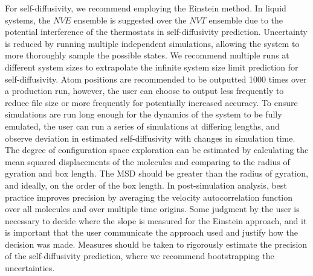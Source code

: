 \documentclass[9pt,bestpractices]{livecoms}
\begin{document}
For self-diffusivity, we recommend employing the Einstein method. In liquid systems, the $NVE$ ensemble is suggested over the $NVT$ ensemble due to the potential interference of the thermostats in self-diffusivity prediction. Uncertainty is reduced by running multiple independent simulations, allowing the system to more thoroughly sample the possible states. We recommend multiple runs at different system sizes to extrapolate the infinite system size limit prediction for self-diffusivity. Atom positions are recommended to be outputted 1000 times over a production run, however, the user can choose to output less frequently to reduce file size or more frequently for potentially increased accuracy. To ensure simulations are run long enough for the dynamics of the system to be fully emulated, the user can run a series of simulations at differing lengths, and observe deviation in estimated self-diffusivity with changes in simulation time. The degree of configuration space exploration can be estimated by calculating the mean squared displacements of the molecules and comparing to the radius of gyration and box length. The MSD should be greater than the radius of gyration, and ideally, on the order of the box length. In post-simulation analysis, best practice improves precision by averaging the velocity autocorrelation function over all molecules and over multiple time origins. Some judgment by the user is necessary to decide where the slope is measured for the Einstein approach, and it is important that the user communicate the approach used and justify how the decision was made. Measures should be taken to rigorously estimate the precision of the self-diffusivity prediction, where we recommend bootstrapping the uncertainties.
\end{document}
